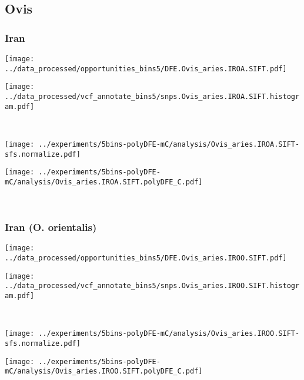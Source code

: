 \subsection{Ovis}

\subsubsection{Iran}

\begin{minipage}{0.49\linewidth}
    \texttt{[image: ../data\_processed/opportunities\_bins5/DFE.Ovis\_aries.IROA.SIFT.pdf]}
\end{minipage}
\begin{minipage}{0.49\linewidth}
    \texttt{[image: ../data\_processed/vcf\_annotate\_bins5/snps.Ovis\_aries.IROA.SIFT.histogram.pdf]}
\end{minipage}
\\
\begin{minipage}{0.49\linewidth}
    \texttt{[image: ../experiments/5bins-polyDFE-mC/analysis/Ovis\_aries.IROA.SIFT-sfs.normalize.pdf]}
\end{minipage}
\begin{minipage}{0.49\linewidth}
    \texttt{[image: ../experiments/5bins-polyDFE-mC/analysis/Ovis\_aries.IROA.SIFT.polyDFE\_C.pdf]}
\end{minipage}
\\

\subsubsection{Iran (O. orientalis)}

\begin{minipage}{0.49\linewidth}
    \texttt{[image: ../data\_processed/opportunities\_bins5/DFE.Ovis\_aries.IROO.SIFT.pdf]}
\end{minipage}
\begin{minipage}{0.49\linewidth}
    \texttt{[image: ../data\_processed/vcf\_annotate\_bins5/snps.Ovis\_aries.IROO.SIFT.histogram.pdf]}
\end{minipage}
\\
\begin{minipage}{0.49\linewidth}
    \texttt{[image: ../experiments/5bins-polyDFE-mC/analysis/Ovis\_aries.IROO.SIFT-sfs.normalize.pdf]}
\end{minipage}
\begin{minipage}{0.49\linewidth}
    \texttt{[image: ../experiments/5bins-polyDFE-mC/analysis/Ovis\_aries.IROO.SIFT.polyDFE\_C.pdf]}
\end{minipage}
\\

